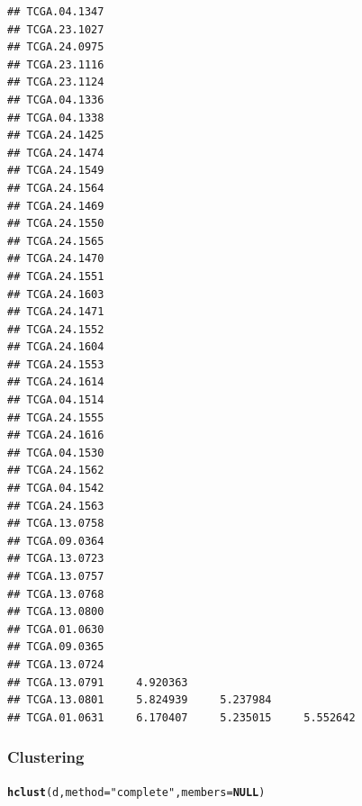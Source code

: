 \documentclass[UTF8]{beamer}\usepackage[]{graphicx}\usepackage[]{color}
\makeatletter
\newcommand{\hlstr}[1]{\textcolor[rgb]{0.192,0.494,0.8}{#1}}%
\newcommand{\hlstd}[1]{\textcolor[rgb]{0.345,0.345,0.345}{#1}}%
\newcommand{\hlkwa}[1]{\textcolor[rgb]{0.161,0.373,0.58}{\textbf{#1}}}%
\newcommand{\hlkwc}[1]{\textcolor[rgb]{0.333,0.667,0.333}{#1}}%
\newcommand{\hlkwd}[1]{\textcolor[rgb]{0.737,0.353,0.396}{\textbf{#1}}}%
\newenvironment{kframe}{%
 \def\at@end@of@kframe{}%
 \ifinner\ifhmode%
  \def\at@end@of@kframe{\end{minipage}}%
  \begin{minipage}{\columnwidth}%
 \fi\fi%
 \def\FrameCommand##1{\hskip\@totalleftmargin \hskip-\fboxsep
 \colorbox{shadecolor}{##1}\hskip-\fboxsep
     \hskip-\linewidth \hskip-\@totalleftmargin \hskip\columnwidth}%
 \MakeFramed {\advance\hsize-\width
   \@totalleftmargin\z@ \linewidth\hsize
   \@setminipage}}%
 {\par\unskip\endMakeFramed%
 \at@end@of@kframe}
\newenvironment{knitrout}{}{} %
\makeatother
\begin{document}
\begin{frame}[fragile]
\begin{knitrout}
\begin{kframe}
\begin{verbatim}
## TCGA.04.1347                                       
## TCGA.23.1027                                       
## TCGA.24.0975                                       
## TCGA.23.1116                                       
## TCGA.23.1124                                       
## TCGA.04.1336                                       
## TCGA.04.1338                                       
## TCGA.24.1425                                       
## TCGA.24.1474                                       
## TCGA.24.1549                                       
## TCGA.24.1564                                       
## TCGA.24.1469                                       
## TCGA.24.1550                                       
## TCGA.24.1565                                       
## TCGA.24.1470                                       
## TCGA.24.1551                                       
## TCGA.24.1603                                       
## TCGA.24.1471                                       
## TCGA.24.1552                                       
## TCGA.24.1604                                       
## TCGA.24.1553                                       
## TCGA.24.1614                                       
## TCGA.04.1514                                       
## TCGA.24.1555                                       
## TCGA.24.1616                                       
## TCGA.04.1530                                       
## TCGA.24.1562                                       
## TCGA.04.1542                                       
## TCGA.24.1563                                       
## TCGA.13.0758                                       
## TCGA.09.0364                                       
## TCGA.13.0723                                       
## TCGA.13.0757                                       
## TCGA.13.0768                                       
## TCGA.13.0800                                       
## TCGA.01.0630                                       
## TCGA.09.0365                                       
## TCGA.13.0724                                       
## TCGA.13.0791     4.920363                          
## TCGA.13.0801     5.824939     5.237984             
## TCGA.01.0631     6.170407     5.235015     5.552642
\end{verbatim}
\end{kframe}
\end{knitrout}

\end{frame}

\begin{frame}[fragile]
  \frametitle{Clustering}

\begin{knitrout}
\color{fgcolor}\begin{kframe}
\begin{alltt}
 \hlkwd{hclust}\hlstd{(d,} \hlkwc{method} \hlstd{=} \hlstr{"complete"}\hlstd{,} \hlkwc{members} \hlstd{=} \hlkwa{NULL}\hlstd{)}
\end{alltt}
\end{kframe}
\end{knitrout}
\end{frame}
\end{document}
